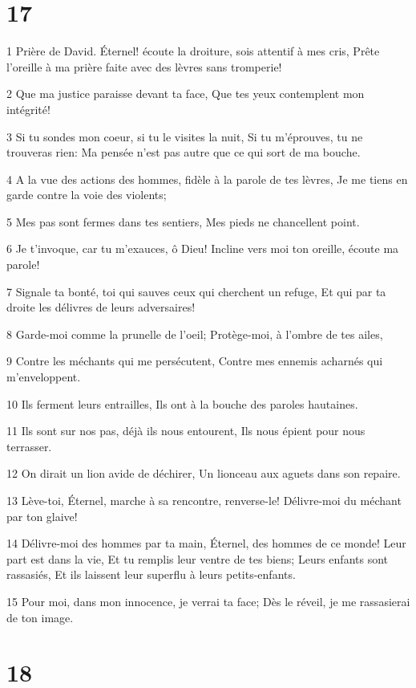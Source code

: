 \chapter{17}

\par 1 Prière de David. Éternel! écoute la droiture, sois attentif à mes cris, Prête l'oreille à ma prière faite avec des lèvres sans tromperie!
\par 2 Que ma justice paraisse devant ta face, Que tes yeux contemplent mon intégrité!
\par 3 Si tu sondes mon coeur, si tu le visites la nuit, Si tu m'éprouves, tu ne trouveras rien: Ma pensée n'est pas autre que ce qui sort de ma bouche.
\par 4 A la vue des actions des hommes, fidèle à la parole de tes lèvres, Je me tiens en garde contre la voie des violents;
\par 5 Mes pas sont fermes dans tes sentiers, Mes pieds ne chancellent point.
\par 6 Je t'invoque, car tu m'exauces, ô Dieu! Incline vers moi ton oreille, écoute ma parole!
\par 7 Signale ta bonté, toi qui sauves ceux qui cherchent un refuge, Et qui par ta droite les délivres de leurs adversaires!
\par 8 Garde-moi comme la prunelle de l'oeil; Protège-moi, à l'ombre de tes ailes,
\par 9 Contre les méchants qui me persécutent, Contre mes ennemis acharnés qui m'enveloppent.
\par 10 Ils ferment leurs entrailles, Ils ont à la bouche des paroles hautaines.
\par 11 Ils sont sur nos pas, déjà ils nous entourent, Ils nous épient pour nous terrasser.
\par 12 On dirait un lion avide de déchirer, Un lionceau aux aguets dans son repaire.
\par 13 Lève-toi, Éternel, marche à sa rencontre, renverse-le! Délivre-moi du méchant par ton glaive!
\par 14 Délivre-moi des hommes par ta main, Éternel, des hommes de ce monde! Leur part est dans la vie, Et tu remplis leur ventre de tes biens; Leurs enfants sont rassasiés, Et ils laissent leur superflu à leurs petits-enfants.
\par 15 Pour moi, dans mon innocence, je verrai ta face; Dès le réveil, je me rassasierai de ton image.

\chapter{18}

